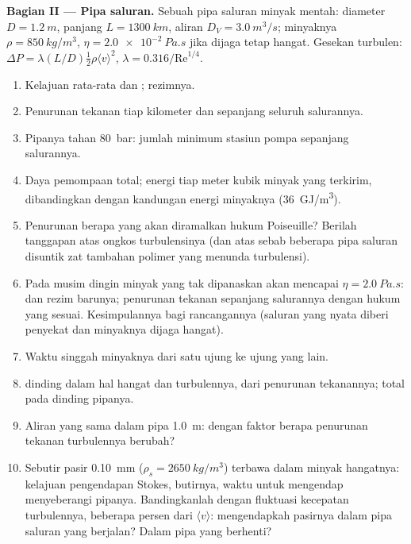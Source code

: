 \begin{problem}
\medskip
\noindent\textbf{Bagian II --- Pipa saluran.}
Sebuah pipa saluran minyak mentah: diameter $D = \qty{1.2}{m}$, panjang $L = \qty{1300}{km}$,
aliran $D_V = \qty{3.0}{m^3/s}$; minyaknya $\rho = \qty{850}{kg/m^3}$, $\eta =
\qty{2.0e-2}{Pa.s}$ jika dijaga tetap hangat. Gesekan turbulen: $\Delta P = \lambda
(L/D)\tfrac12\rho\langle v\rangle^2$, $\lambda = 0.316/\mathrm{Re}^{1/4}$.
\begin{enumerate}[resume]
  \item Kelajuan rata-rata dan ; rezimnya.
  \item Penurunan tekanan tiap kilometer dan sepanjang seluruh salurannya.
  \item Pipanya tahan \qty{80}{bar}: jumlah minimum stasiun pompa
        sepanjang salurannya.
  \item Daya pemompaan total; energi tiap meter kubik minyak yang
        terkirim, dibandingkan dengan kandungan energi minyaknya
        (\qty{36}{GJ/m^3}).
  \item Penurunan berapa yang akan diramalkan hukum Poiseuille? Berilah
        tanggapan atas ongkos turbulensinya (dan atas sebab beberapa
        pipa saluran disuntik zat tambahan polimer yang menunda
        turbulensi).
  \item Pada musim dingin minyak yang tak dipanaskan akan mencapai
        $\eta = \qty{2.0}{Pa.s}$:  dan rezim barunya;
        penurunan tekanan sepanjang salurannya dengan hukum yang sesuai.
        Kesimpulannya bagi rancangannya (saluran yang nyata diberi
        penyekat dan minyaknya dijaga hangat).
  \item Waktu singgah minyaknya dari satu ujung ke ujung yang lain.
  \item {} dinding dalam hal hangat dan turbulennya, dari
        penurunan tekanannya;  total pada dinding pipanya.
  \item Aliran yang sama dalam pipa \qty{1.0}{m}: dengan faktor berapa
        penurunan tekanan turbulennya berubah?
  \item Sebutir pasir \qty{0.10}{mm} ($\rho_s = \qty{2650}{kg/m^3}$) terbawa
        dalam minyak hangatnya: kelajuan pengendapan Stokes,  butirnya, waktu untuk mengendap menyeberangi pipanya.
        Bandingkanlah dengan fluktuasi kecepatan turbulennya, beberapa
        persen dari $\langle v
        \rangle$: mengendapkah pasirnya dalam pipa saluran yang
        berjalan? Dalam pipa yang berhenti?
\end{enumerate}


\end{problem}
